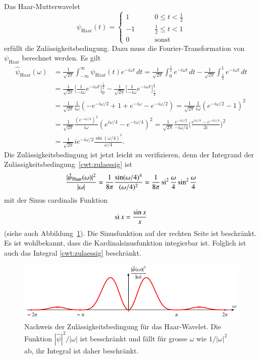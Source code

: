\begin{beispiel}
Das Haar-Mutterwavelet
\[
\psi_{\text{Haar}}(t) = \begin{cases}
 1&\qquad 0\le t < \frac12\\
-1&\qquad \frac12 \le t < 1\\
 0&\qquad \text{sonst}
\end{cases}
\]
erfüllt die Zulässigkeitsbedingung.
Dazu muss die Fourier-Transformation von $\psi_{\text{Haar}}$ berechnet
werden.
Es gilt
\begin{align*}
\hat{\psi}_{\text{Haar}}(\omega)
&=
\frac{1}{\sqrt{2\pi}}
\int_{-\infty}^\infty \psi_{\text{Haar}}(t) e^{-i\omega t}\,dt
=
\frac{1}{\sqrt{2\pi}}
\int_0^{\frac12} e^{-i\omega t}\,dt
-
\frac1{\sqrt{2\pi}}
\int_{\frac12}^1e^{-i\omega t}\,dt
\\
&=
\frac1{\sqrt{2\pi}}
\biggl[\frac1{-i\omega}e^{-i\omega t} \biggr]_0^{\frac12}
-
\frac1{\sqrt{2\pi}}
\biggl[\frac1{-i\omega}e^{-i\omega t} \biggr]_{\frac12}^1
\\
&=
\frac{1}{\sqrt{2\pi}}
\frac{1}{i\omega}
(
-e^{-i\omega/2} + 1 + e^{-i\omega} - e^{-i\omega/2}
)
=
\frac{1}{\sqrt{2\pi}}
\frac{1}{i\omega}
( e^{-i\omega/2}-1)^2
\\
&=
\frac{1}{\sqrt{2\pi}}
\frac{(e^{-i\omega/4})^2}{i\omega}
( e^{i\omega/4} - e^{-i\omega/4})^2
=
\frac{1}{\sqrt{2\pi}}
\frac{e^{-i\omega/2}}{-i\omega/4}
\biggl(\frac{e^{i\omega/4}-e^{-i\omega/4}}{2i}\biggr)^2
\\
&=
\frac{1}{\sqrt{2\pi}}
ie^{-i\omega/2}
\frac{\sin(\omega/4)^2}{\omega/4}.
\end{align*}
Die Zulässigkeitsbedingung ist jetzt leicht zu verifizieren, denn
der Integrand der Zulässigkeitsbedingung~\eqref{cwt:zulaessig} ist
\[
\frac{|\hat{\psi}_{\text{Haar}}(\omega)|^2}{|\omega|}
=
\frac{1}{8\pi}\frac{\sin(\omega/4)^4}{(\omega/4)^2}
=
\frac{1}{8\pi}\si^2\frac{\omega}4 \sin^2 \frac{\omega}4
\]
mit der Sinus cardinalis Funktion
\[
\si x = \frac{\sin x}{x}
\]
(siehe auch Abbildung~\ref{cwt:figure:haarzulaessig}).
Die Sinusfunktion auf der rechten Seite ist beschränkt.
Es ist wohlbekannt, dass die Kardinalsinusfunktion integierbar ist.
Folglich ist auch das Integral \eqref{cwt:zulaessig} beschränkt.
\end{beispiel}

\begin{figure}
\centering
\includegraphics{chapters/4-cwt/images/hatpsi.pdf}
\caption{Nachweis der Zulässigkeitsbedingung für das Haar-Wavelet.
Die Funktion $|\hat{\psi}|^2/|\omega|$ ist besschränkt und fällt
für grosse $\omega$ wie $1/|\omega|^2$ ab, ihr Integral ist daher
beschränkt.
\label{cwt:figure:haarzulaessig}}
\end{figure}

